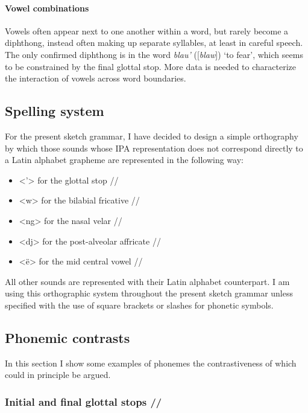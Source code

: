 \documentclass[subpreambles=true]{standalone}
\begin{document}
\paragraph{Vowel combinations}

Vowels often appear next to one another within a word, but rarely become a diphthong, instead often making up separate syllables, at least in careful speech. The only confirmed diphthong is in the word \textit{blau'} ([\textit{blaw\textglotstop}]) `to fear', which seems to be constrained by the final glottal stop. More data is needed to characterize the interaction of vowels across word boundaries.


\subsection{Spelling system}\label{sec:spel}

For the present sketch grammar, I have decided to design a simple orthography by which those sounds whose IPA representation does not correspond directly to a Latin alphabet grapheme are represented in the following way:

\begin{itemize}

\item <'> for the glottal stop /\textglotstop /
\item <w> for the bilabial fricative /\textbeta /
\item <ng> for the nasal velar //
\item <dj> for the post-alveolar affricate //
\item <ë> for the mid central vowel /\textschwa /

\end{itemize}

All other sounds are represented with their Latin alphabet counterpart. I am using this orthographic system throughout the present sketch grammar unless specified with the use of square brackets or slashes for phonetic symbols.

\subsection{Phonemic contrasts}\label{sec:contr}

In this section I show some examples of phonemes the contrastiveness of which could in principle be argued.

\subsubsection{Initial and final glottal stops /\textglotstop/}
\end{document}
